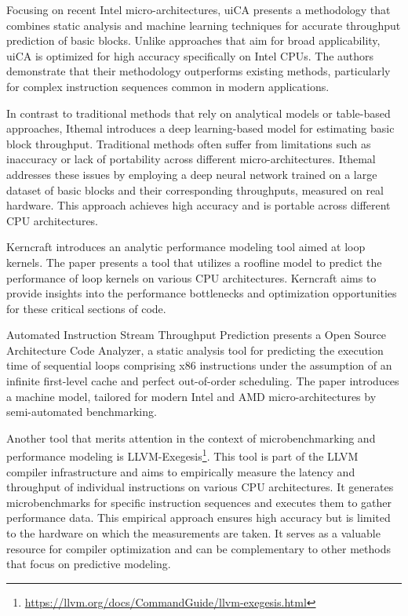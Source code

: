 Focusing on recent Intel micro-architectures, uiCA presents a methodology that combines static analysis
and machine learning techniques for accurate throughput prediction of basic 
blocks\cite{abelUiCAAccurateThroughput2022}. Unlike approaches that aim for broad applicability, 
uiCA is optimized for high accuracy specifically on Intel CPUs. The authors demonstrate that their 
methodology outperforms existing methods, particularly for complex instruction sequences common in 
modern applications.

In contrast to traditional methods that rely on analytical models or table-based approaches, Ithemal 
introduces a deep learning-based model for estimating basic block throughput. Traditional methods 
often suffer from limitations such as inaccuracy or lack of portability across different micro-architectures.
Ithemal addresses these issues by employing a deep neural network trained on a large dataset of basic
blocks and their corresponding throughputs, measured on real hardware. This approach achieves high 
accuracy and is portable across different CPU architectures.

Kerncraft introduces an analytic performance modeling tool aimed at loop 
kernels\cite{hammerKerncraftToolAnalytic2017}. The paper presents a tool that utilizes a roofline model 
to predict the performance of loop kernels on various CPU architectures. Kerncraft aims to provide insights
into the performance bottlenecks and optimization opportunities for these critical sections of code.

Automated Instruction Stream Throughput Prediction presents a Open Source Architecture Code Analyzer, 
a static analysis tool for predicting the execution time of sequential loops comprising x86 instructions
under the assumption of an infinite first-level cache and perfect out-of-order 
scheduling\cite{laukemannAutomatedInstructionStream2018}. The paper introduces a machine model, tailored 
for modern Intel and AMD micro-architectures by semi-automated benchmarking.

Another tool that merits attention in the context of microbenchmarking and performance modeling is 
LLVM-Exegesis\footnote{\url{https://llvm.org/docs/CommandGuide/llvm-exegesis.html}}.
This tool is part of the LLVM compiler infrastructure and aims to 
empirically measure the latency and throughput of individual instructions on various CPU architectures. 
It generates microbenchmarks for specific instruction sequences and executes them to gather performance 
data. This empirical approach ensures high accuracy but is limited to the hardware on which the measurements
are taken. It serves as a valuable resource for compiler optimization and can be complementary to other 
methods that focus on predictive modeling.

